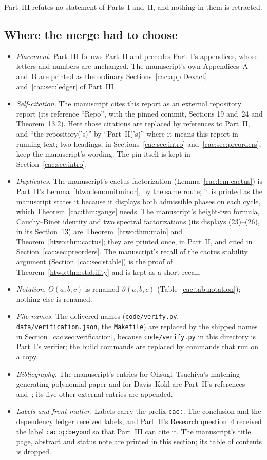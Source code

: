 \documentclass[11pt]{article}
\numberwithin{equation}{section}
\theoremstyle{definition}
\begin{document}
Part~III refutes no statement of Parts~I and~II, and nothing in them is
retracted.

\subsection{Where the merge had to choose}
\label{cac:sec:merge}
\begin{itemize}[leftmargin=1.4em]
\item \emph{Placement.} Part~III follows Part~II and precedes Part~I's
appendices, whose letters and numbers are unchanged. The manuscript's own
Appendices~A and~B are printed as the ordinary
Sections~\ref{cac:app:Dexact} and~\ref{cac:sec:ledger} of Part~III.
\item \emph{Self-citation.} The manuscript cites this report as an external
repository report (its reference ``Repo'', with the pinned commit, Sections
19 and~24 and Theorem~13.2). Here those citations are replaced by
references to Part~II, and ``the repository('s)'' by ``Part~II('s)'' where
it means this report in running text; two headings, in
Sections~\ref{cac:sec:intro} and~\ref{cac:sec:preorders}, keep the
manuscript's wording. The pin itself is kept in
Section~\ref{cac:sec:intro}.
\item \emph{Duplicates.} The manuscript's cactus factorization
(Lemma~\ref{cac:lem:cactus}) is Part~II's Lemma~\ref{htwo:lem:unitminor},
by the same route; it is printed as the manuscript states it because it
displays both admissible phases on each cycle, which
Theorem~\ref{cac:thm:gauge} needs. The manuscript's height-two formula,
Cauchy--Binet identity and two spectral factorizations (its displays
(23)--(26), in its Section~13) are Theorem~\ref{htwo:thm:main} and
Theorem~\ref{htwo:thm:cactus}; they are printed once, in Part~II, and cited
in Section~\ref{cac:sec:preorders}. The manuscript's recall of the cactus
stability argument (Section~\ref{cac:sec:stable}) is the proof of
Theorem~\ref{htwo:thm:stability} and is kept as a short recall.
\item \emph{Notation.} $\Theta(a,b,c)$ is renamed $\vartheta(a,b,c)$
(Table~\ref{cac:tab:notation}); nothing else is renamed.
\item \emph{File names.} The delivered names (\texttt{code/verify.py},
\texttt{data/verification.json}, the \texttt{Makefile}) are replaced by the
shipped names in Section~\ref{cac:sec:verification}, because
\texttt{code/verify.py} in this directory is Part~I's verifier; the build
commands are replaced by commands that run on a copy.
\item \emph{Bibliography.} The manuscript's entries for Ohsugi--Tsuchiya's
matching-generating-polynomial paper and for Davis--Kohl are Part~II's
references~\cite{OT21} and~\cite{DK}; its five other external entries are
appended.
\item \emph{Labels and front matter.} Labels carry the prefix \texttt{cac:}.
The conclusion and the dependency ledger received labels, and Part~II's
Research question~4 received the label \texttt{cac:q:beyond} so that
Part~III can cite it. The manuscript's title page, abstract and status note
are printed in this section; its table of contents is dropped.
\end{itemize}
\end{document}
